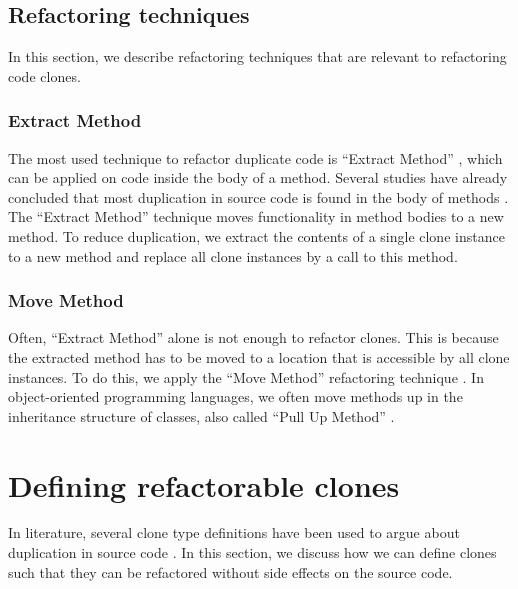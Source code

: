 \documentclass[sigconf,review]{acmart}
\begin{document}
\subsection{Refactoring techniques}
In this section, we describe refactoring techniques that are relevant to refactoring code clones.

\subsubsection{Extract Method}
The most used technique to refactor duplicate code is ``Extract Method'' \cite{fowler2018refactoring}, which can be applied on code inside the body of a method. Several studies have already concluded that most duplication in source code is found in the body of methods \cite{lozano2007evaluating, white2016deep, bergman2004ethnographic}. The ``Extract Method'' technique moves functionality in method bodies to a new method. To reduce duplication, we extract the contents of a single clone instance to a new method and replace all clone instances by a call to this method.

\subsubsection{Move Method}
Often, ``Extract Method'' alone is not enough to refactor clones. This is because the extracted method has to be moved to a location that is accessible by all clone instances. To do this, we apply the ``Move Method'' refactoring technique \cite{fowler2018refactoring}. In object-oriented programming languages, we often move methods up in the inheritance structure of classes, also called ``Pull Up Method'' \cite{fowler2018refactoring}.

\section{Defining refactorable clones}
In literature, several clone type definitions have been used to argue about duplication in source code \cite{roy2007survey}. In this section, we discuss how we can define clones such that they can be refactored without side effects on the source code.
\end{document}
